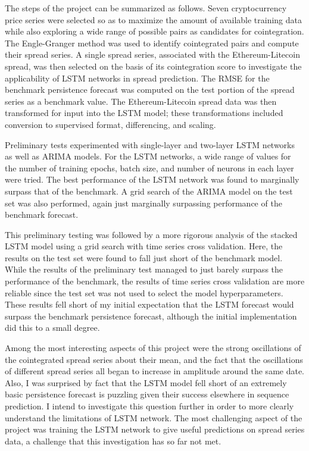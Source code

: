 \documentclass{article}
\begin{document}
The steps of the project can be summarized as follows. Seven cryptocurrency price series were selected so as to maximize the amount of available training data while also exploring a wide range of possible pairs as candidates for cointegration. The Engle-Granger method was used to identify cointegrated pairs and compute their spread series. A single spread series, associated with the Ethereum-Litecoin spread, was then selected on the basis of its cointegration score to investigate the applicability of LSTM networks in spread prediction. The RMSE for the benchmark persistence forecast was computed on the test portion of the spread series as a benchmark value. The Ethereum-Litecoin spread data was then transformed for input into the LSTM model; these transformations included conversion to supervised format, differencing, and scaling. 

Preliminary tests experimented with single-layer and two-layer LSTM networks as well as ARIMA models. For the LSTM networks, a wide range of values for the number of training epochs, batch size, and number of neurons in each layer were tried. The best performance of the LSTM network was found to marginally surpass that of the benchmark. A grid search of the ARIMA model on the test set was also performed, again just marginally surpassing performance of the benchmark forecast. 

This preliminary testing was followed by a more rigorous analysis of the stacked LSTM model using a grid search with time series cross validation. Here, the results on the test set were found to fall just short of the benchmark model. While the results of the preliminary test managed to just barely surpass the performance of the benchmark, the results of time series cross validation are more reliable since the test set was not used to select the model hyperparameters. These results fell short of my initial expectation that the LSTM forecast would surpass the benchmark persistence forecast, although the initial implementation did this to a small degree.  

Among the most interesting aspects of this project were the strong oscillations of the cointegrated spread series about their mean, and the fact that the oscillations of different spread series all began to increase in amplitude around the same date. Also, I was surprised by fact that the LSTM model fell short of an extremely basic persistence forecast is puzzling given their success elsewhere in sequence prediction. I intend to investigate this question further in order to more clearly understand the limitations of LSTM network. The most challenging aspect of the project was training the LSTM network to give useful predictions on spread series data, a challenge that this investigation has so far not met. 
\end{document}
